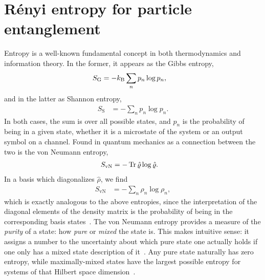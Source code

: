 \chapter{Rényi entropy for particle entanglement}

\label{chap:renyi}

Entropy is a well-known fundamental concept in both thermodynamics and information theory.
In the former, it appears as the Gibbs entropy,~\cite[48]{mcquarrie1976statistical}
\begin{align}
	S_\mathrm{G}
	&= -k_\mathrm{B} \sum_n p_n \log{p_n},
\end{align}
and in the latter as Shannon entropy,~\cite{shannon1948mathematical}
\begin{align}
	S_\mathrm{S}
	&= -\sum_n p_n \log{p_n}.
\end{align}
In both cases, the sum is over all possible states, and $p_n$ is the probability of being in a given state, whether it is a microstate of the system or an output symbol on a channel.
Found in quantum mechanics as a connection between the two is the von Neumann entropy,~\cite[253]{wilde2013quantum}
\begin{align}
	S_\mathrm{vN}
	&= -\operatorname{Tr}{\hat{\varrho} \log{\hat{\varrho}}}.
\end{align}
In a basis which diagonalizes $\hat{\rho}$, we find
\begin{align}
	S_\mathrm{vN}
	&= -\sum_n \rho_n \log{\rho_n},
\end{align}
which is exactly analogous to the above entropies, since the interpretation of the diagonal elements of the density matrix is the probability of being in the corresponding basis states~\cite[102]{wilde2013quantum}.
The von Neumann entropy provides a measure of the \emph{purity} of a state: how \emph{pure} or \emph{mixed} the state is.
This makes intuitive sense: it assigns a number to the uncertainty about which pure state one actually holds if one only has a mixed state description of it~\cite[254]{wilde2013quantum}.
Any pure state naturally has zero entropy, while maximally-mixed states have the largest possible entropy for systems of that Hilbert space dimension~\cite[255]{wilde2013quantum}.

